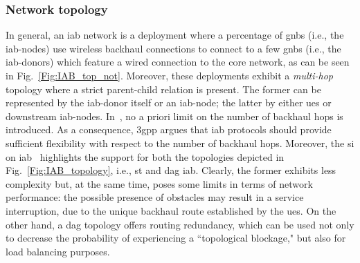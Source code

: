 \subsubsection{Network topology}
In general, an \gls{iab} network is a deployment where a percentage of \glspl{gnb} (i.e., the \gls{iab}-nodes) use wireless backhaul connections to connect to a few \glspl{gnb} (i.e., the \gls{iab}-donors) which feature a wired connection to the core network, as can be seen in Fig.~\ref{Fig:IAB_top_not}.
Moreover, these deployments exhibit a \textit{multi-hop} topology where a strict parent-child relation is present. The former can be represented by the \gls{iab}-donor itself or an \gls{iab}-node; the latter by either \gls{ue}s or downstream \gls{iab}-nodes. In~\cite{3gpp_38_874}, no a priori limit on the number of backhaul hops is introduced. As a consequence, \gls{3gpp} argues that \gls{iab} protocols should provide sufficient flexibility with respect to the number of backhaul hops. 
Moreover, the \gls{si} on \gls{iab}~\cite{3gpp_38_874} highlights the support for both the topologies depicted in Fig.~\ref{Fig:IAB_topology}, i.e., \gls{st} and \gls{dag} \gls{iab}. Clearly, the former exhibits less complexity but, at the same time, poses some limits in terms of network performance: the possible presence of obstacles may result in a service interruption, due to the unique backhaul route established by the \glspl{ue}. 
On the other hand, a \gls{dag} topology offers routing redundancy, which can be used not only to decrease the probability of experiencing a ``topological blockage," but also for load balancing purposes.

